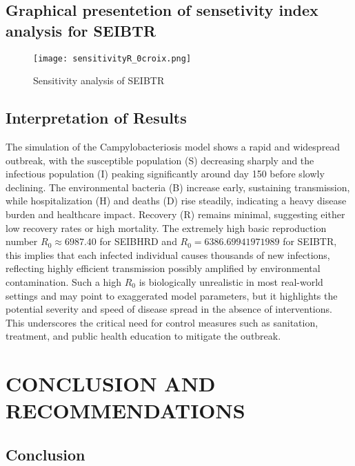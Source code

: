 \documentclass[a4paper,12pt]{report}
\begin{document}
\begin{itemize}
\section{Graphical presentetion of sensetivity index analysis for SEIBTR}


\begin{figure}[H]
    \centering
    \texttt{[image: sensitivityR\_0croix.png]}
    \caption{Sensitivity analysis of SEIBTR}
    \label{fig:enter-label}
\end{figure}



\section{Interpretation of Results}



 The simulation of the Campylobacteriosis model shows a rapid and widespread outbreak, with the susceptible population (S) decreasing sharply and the infectious population (I) peaking significantly around day 150 before slowly declining. The environmental bacteria (B) increase early, sustaining transmission, while hospitalization (H) and deaths (D) rise steadily, indicating a heavy disease burden and healthcare impact. Recovery (R) remains minimal, suggesting either low recovery rates or high mortality. The extremely high basic reproduction number $R_0 \approx 6987.40$ for SEIBHRD and $R_0= 6386.69941971989$ for SEIBTR, this implies that each infected individual causes thousands of new infections, reflecting highly efficient transmission possibly amplified by environmental contamination. Such a high $R_0$ is biologically unrealistic in most real-world settings and may point to exaggerated model parameters, but it highlights the potential severity and speed of disease spread in the absence of interventions. This underscores the critical need for control measures such as sanitation, treatment, and public health education to mitigate the outbreak.


\newpage

\chapter{ CONCLUSION AND RECOMMENDATIONS}

\section{ Conclusion}



\end{itemize}
\end{document}
